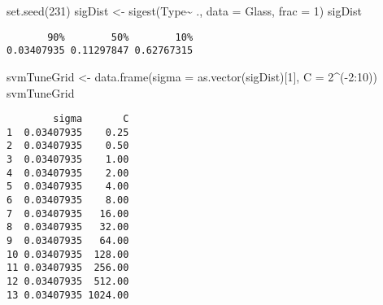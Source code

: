 \documentclass[
  letterpaper,
  DIV=11,
  numbers=noendperiod]{scrartcl}
\newenvironment{Shaded}{\begin{snugshade}}{\end{snugshade}}
\newcommand{\AttributeTok}[1]{\textcolor[rgb]{0.40,0.45,0.13}{#1}}
\newcommand{\DecValTok}[1]{\textcolor[rgb]{0.68,0.00,0.00}{#1}}
\newcommand{\FunctionTok}[1]{\textcolor[rgb]{0.28,0.35,0.67}{#1}}
\newcommand{\NormalTok}[1]{\textcolor[rgb]{0.00,0.23,0.31}{#1}}
\newcommand{\OtherTok}[1]{\textcolor[rgb]{0.00,0.23,0.31}{#1}}
\newcommand{\SpecialCharTok}[1]{\textcolor[rgb]{0.37,0.37,0.37}{#1}}
\begin{document}
\begin{Shaded}
\begin{Highlighting}[]
\FunctionTok{set.seed}\NormalTok{(}\DecValTok{231}\NormalTok{) }
\NormalTok{sigDist }\OtherTok{\textless{}{-}} \FunctionTok{sigest}\NormalTok{(Type}\SpecialCharTok{\textasciitilde{}}\NormalTok{ ., }\AttributeTok{data =}\NormalTok{ Glass, }\AttributeTok{frac =} \DecValTok{1}\NormalTok{)}
\NormalTok{sigDist }
\end{Highlighting}
\end{Shaded}

\begin{verbatim}
       90%        50%        10% 
0.03407935 0.11297847 0.62767315 
\end{verbatim}

\begin{Shaded}
\begin{Highlighting}[]
\NormalTok{svmTuneGrid }\OtherTok{\textless{}{-}} \FunctionTok{data.frame}\NormalTok{(}\AttributeTok{sigma =} \FunctionTok{as.vector}\NormalTok{(sigDist)[}\DecValTok{1}\NormalTok{], }\AttributeTok{C =} \DecValTok{2}\SpecialCharTok{\^{}}\NormalTok{(}\SpecialCharTok{{-}}\DecValTok{2}\SpecialCharTok{:}\DecValTok{10}\NormalTok{)) }
\NormalTok{svmTuneGrid }
\end{Highlighting}
\end{Shaded}

\begin{verbatim}
        sigma       C
1  0.03407935    0.25
2  0.03407935    0.50
3  0.03407935    1.00
4  0.03407935    2.00
5  0.03407935    4.00
6  0.03407935    8.00
7  0.03407935   16.00
8  0.03407935   32.00
9  0.03407935   64.00
10 0.03407935  128.00
11 0.03407935  256.00
12 0.03407935  512.00
13 0.03407935 1024.00
\end{verbatim}
\end{document}
